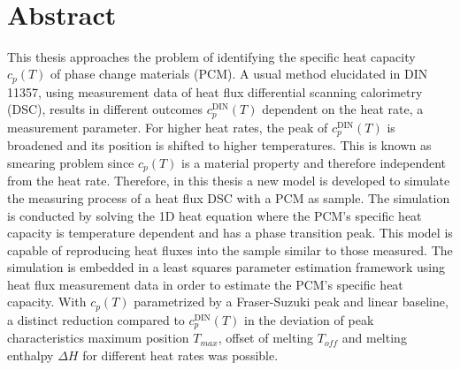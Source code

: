 \documentclass{scrartcl}[12pt, halfparskip]
\numberwithin{equation}{section}
\numberwithin{figure}{section}
\numberwithin{table}{section}
\begin{document}
\newpage


\begin{titlepage}
	\mbox{}\\
\end{titlepage}



\section*{Abstract}

This thesis approaches the problem of identifying the specific heat capacity $c_p(T)$ of phase change materials (PCM). 
A usual method elucidated in DIN 11357, using measurement data of heat flux differential scanning calorimetry (DSC), results in different outcomes $c_p^{\text{DIN}}(T)$ dependent on the heat rate, a measurement parameter. 
For higher heat rates, the peak of $c_p^{\text{DIN}}(T)$ is broadened and its position is shifted to higher temperatures. 
This is known as smearing problem since $c_p(T)$ is a material property and therefore independent from the heat rate.
Therefore, in this thesis a new model is developed to simulate the measuring process of a heat flux DSC with a PCM as sample.
The simulation is conducted by solving the 1D heat equation where the PCM's specific heat capacity is temperature dependent and has a phase transition peak. 
This model is capable of reproducing heat fluxes into the sample similar to those measured. 
The simulation is embedded in a least squares parameter estimation framework using heat flux measurement data in order to estimate the PCM's specific heat capacity. 
With $c_p(T)$ parametrized by a Fraser-Suzuki peak and linear baseline, a distinct reduction compared to $c_p^{\text{DIN}}(T)$ in the deviation of peak characteristics maximum position $T_{max}$, offset of melting $T_{off}$ and melting enthalpy $\Delta H$ for different heat rates was possible.
\end{document}
